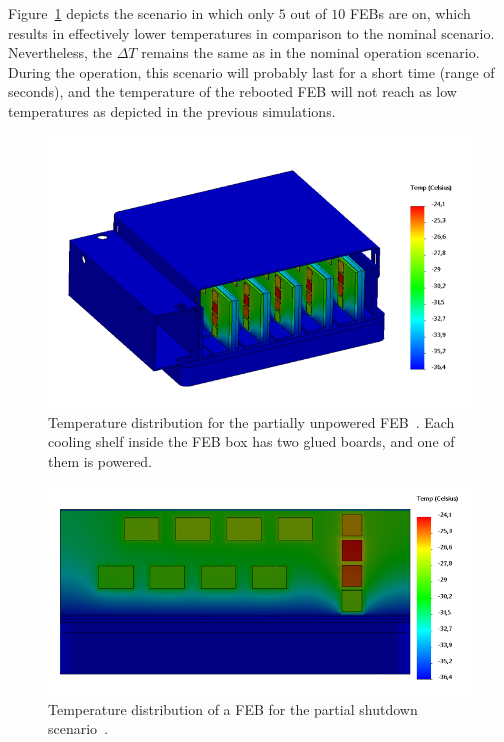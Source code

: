 Figure~\ref{fig_reboot_box} depicts the scenario in which only $5$ out of $10$ \glspl{FEB} are on, which results in effectively lower temperatures in comparison to the nominal scenario. Nevertheless, the $\Delta T$ remains the same as in the nominal operation scenario. During the operation, this scenario will probably last for a short time (range of seconds), and the temperature of the rebooted \gls{FEB} will not reach as low temperatures as depicted in the previous simulations.



\begin{figure}[!h]
\centering
\includegraphics[width=0.57\columnwidth]{Chapter4/images/reboot_box.png}
\caption{Temperature distribution for the partially unpowered \gls{FEB}~\cite{Agarwal}. Each cooling shelf inside the \gls{FEB} box has two glued boards, and one of them is powered.}
\label{fig_reboot_box}
\end{figure}

\begin{figure}[!h]
\centering
\includegraphics[width=0.6\columnwidth]{Chapter4/images/reboot_FEB.png}
\caption{Temperature distribution of a \gls{FEB} for the partial shutdown scenario~\cite{Agarwal}.}
\label{fig_reboot_FEB}
\end{figure}

